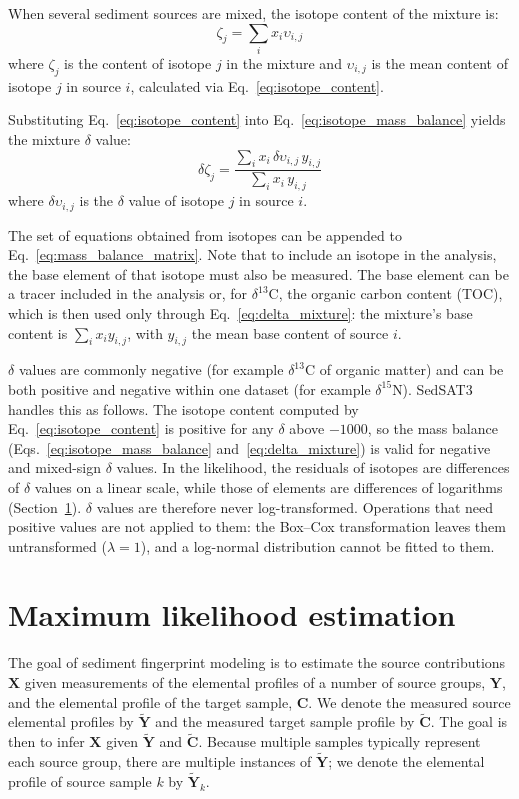 When several sediment sources are mixed, the isotope content of the mixture is:
\begin{equation}\label{eq:isotope_mass_balance}
    \zeta_j = \sum_i x_i \upsilon_{i,j}
\end{equation}
where $\zeta_j$ is the content of isotope $j$ in the mixture and $\upsilon_{i,j}$ is the mean content of isotope $j$ in source $i$, calculated via Eq.~\eqref{eq:isotope_content}.

Substituting Eq.~\eqref{eq:isotope_content} into Eq.~\eqref{eq:isotope_mass_balance} yields the mixture $\delta$ value:
\begin{equation}\label{eq:delta_mixture}
    \delta\zeta_j = \frac{\sum_i x_i\, \delta\upsilon_{i,j}\, y_{i,j}}{\sum_i x_i\, y_{i,j}}
\end{equation}
where $\delta\upsilon_{i,j}$ is the $\delta$ value of isotope $j$ in source $i$.

The set of equations obtained from isotopes can be appended to Eq.~\eqref{eq:mass_balance_matrix}. Note that to include an isotope in the analysis, the base element of that isotope must also be measured. The base element can be a tracer included in the analysis or, for $\delta^{13}$C, the organic carbon content (TOC), which is then used only through Eq.~\eqref{eq:delta_mixture}: the mixture's base content is $\sum_i x_i y_{i,j}$, with $y_{i,j}$ the mean base content of source $i$.

$\delta$ values are commonly negative (for example $\delta^{13}$C of organic matter) and can be both positive and negative within one dataset (for example $\delta^{15}$N). SedSAT3 handles this as follows. The isotope content computed by Eq.~\eqref{eq:isotope_content} is positive for any $\delta$ above $-1000$, so the mass balance (Eqs.~\ref{eq:isotope_mass_balance} and~\ref{eq:delta_mixture}) is valid for negative and mixed-sign $\delta$ values. In the likelihood, the residuals of isotopes are differences of $\delta$ values on a linear scale, while those of elements are differences of logarithms (Section~\ref{sec:mle}). $\delta$ values are therefore never log-transformed. Operations that need positive values are not applied to them: the Box--Cox transformation leaves them untransformed ($\lambda = 1$), and a log-normal distribution cannot be fitted to them.

\section{Maximum likelihood estimation}\label{sec:mle}
The goal of sediment fingerprint modeling is to estimate the source contributions $\mathbf{X}$ given measurements of the elemental profiles of a number of source groups, $\mathbf{Y}$, and the elemental profile of the target sample, $\mathbf{C}$. We denote the measured source elemental profiles by $\tilde{\mathbf{Y}}$ and the measured target sample profile by $\tilde{\mathbf{C}}$. The goal is then to infer $\mathbf{X}$ given $\tilde{\mathbf{Y}}$ and $\tilde{\mathbf{C}}$. Because multiple samples typically represent each source group, there are multiple instances of $\tilde{\mathbf{Y}}$; we denote the elemental profile of source sample $k$ by $\tilde{\mathbf{Y}}_k$.

